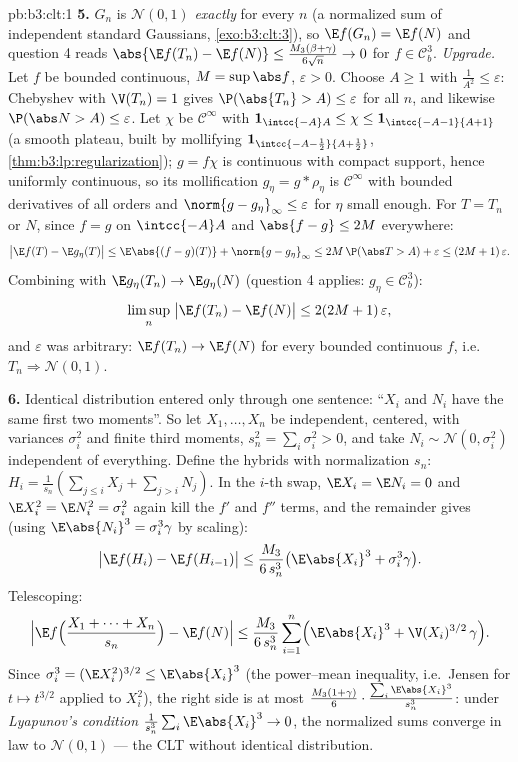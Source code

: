 \begin{solution}{pb:b3:clt:1}
\textbf{5.} $G_n$ is $\mathcal N(0,1)$ \emph{exactly} for
every $n$ (a normalized sum of independent standard
Gaussians, \cref{exo:b3:clt:3}), so $\E f(G_n) = \E f(N)$
and question 4 reads $\abs{\E f(T_n) - \E f(N)} \leq
\frac{M_3(\beta+\gamma)}{6\sqrt n} \to 0$ for $f \in
\mathcal C^3_b$. \emph{Upgrade.} Let $f$ be bounded
continuous, $M = \sup\abs f$, $\varepsilon > 0$. Choose $A
\geq 1$ with $\frac1{A^2} \leq \varepsilon$: Chebyshev with
$\V(T_n) = 1$ gives $\P(\abs{T_n} > A) \leq \varepsilon$
for all $n$, and likewise $\P(\abs N > A) \leq \varepsilon$.
Let $\chi$ be $\mathcal C^\infty$ with
$\mathbf 1_{\intcc{-A}A} \leq \chi \leq
\mathbf 1_{\intcc{-A-1}{A+1}}$ (a smooth plateau, built by
mollifying $\mathbf 1_{\intcc{-A-\frac12}{A+\frac12}}$,
\cref{thm:b3:lp:regularization}); $g = f\chi$ is continuous
with compact support, hence uniformly continuous, so its
mollification $g_\eta = g * \rho_\eta$ is $\mathcal
C^\infty$ with bounded derivatives of all orders and
$\norm{g - g_\eta}_\infty \leq \varepsilon$ for $\eta$
small enough. For $T = T_n$ or $N$, since $f = g$ on
$\intcc{-A}A$ and $\abs{f - g} \leq 2M$ everywhere:
\[
\bigl|\E f(T) - \E g_\eta(T)\bigr| \leq
\E\abs{(f - g)(T)} + \norm{g - g_\eta}_\infty
\leq 2M\,\P(\abs T > A) + \varepsilon \leq
(2M + 1)\,\varepsilon .
\]
Combining with $\E g_\eta(T_n) \to \E g_\eta(N)$ (question
4 applies: $g_\eta \in \mathcal C^3_b$):
\[
\limsup_n\;\bigl|\E f(T_n) - \E f(N)\bigr| \leq
2(2M + 1)\,\varepsilon ,
\]
and $\varepsilon$ was arbitrary: $\E f(T_n) \to \E f(N)$ for
every bounded continuous $f$, i.e.\ $T_n \Rightarrow
\mathcal N(0,1)$.

\textbf{6.} Identical distribution entered only through one
sentence: ``$X_i$ and $N_i$ have the same first two
moments''. So let $X_1, \dots, X_n$ be independent,
centered, with variances $\sigma_i^2$ and finite third
moments, $s_n^2 = \sum_i\sigma_i^2 > 0$, and take $N_i \sim
\mathcal N(0, \sigma_i^2)$ independent of everything.
Define the hybrids with normalization $s_n$: $H_i =
\frac1{s_n}(\sum_{j\leq i}X_j + \sum_{j>i}N_j)$. In the
$i$-th swap, $\E X_i = \E N_i = 0$ and $\E X_i^2 = \E N_i^2
= \sigma_i^2$ again kill the $f'$ and $f''$ terms, and the
remainder gives (using $\E\abs{N_i}^3 = \sigma_i^3\gamma$ by
scaling):
\[
\bigl|\E f(H_i) - \E f(H_{i-1})\bigr| \leq
\frac{M_3}{6\,s_n^3}\bigl(\E\abs{X_i}^3 +
\sigma_i^3\gamma\bigr) .
\]
Telescoping:
\[
\Bigl|\E f\Bigl(\frac{X_1 + \dots + X_n}{s_n}\Bigr) -
\E f(N)\Bigr| \leq \frac{M_3}{6\,s_n^3}\sum_{i=1}^n
\Bigl(\E\abs{X_i}^3 + \V(X_i)^{3/2}\,\gamma\Bigr) .
\]
Since $\sigma_i^3 = (\E X_i^2)^{3/2} \leq \E\abs{X_i}^3$
(the power--mean inequality, i.e.\ Jensen for $t \mapsto
t^{3/2}$ applied to $X_i^2$), the right side is at most
$\frac{M_3(1 + \gamma)}{6}\cdot
\frac{\sum_i\E\abs{X_i}^3}{s_n^3}$: under \emph{Lyapunov's
condition} $\frac1{s_n^3}\sum_i\E\abs{X_i}^3 \to 0$, the
normalized sums converge in law to $\mathcal N(0,1)$ ---
the CLT without identical distribution.


\end{solution}
